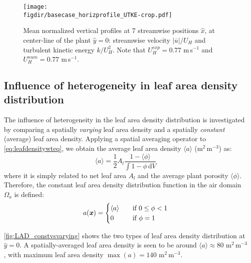 \begin{figure}[t]
	\centering
	\texttt{[image: \\figdir/basecase\_horizprofile\_UTKE-crop.pdf]}
	\caption{Mean normalized vertical profiles at 7 streamwise positions $\hat{x}$, at center-line of the plant $\hat{y} = 0$:  streamwise velocity $|\overline{u}|/U_H$ and  turbulent kinetic energy $k/U_H^2$. Note that $U_H^{\mathit{exp}} = 0.77$ m\,s$^{-1}$ and $U_H^{\mathit{num}} = 0.77$ m\,s$^{-1}$. }
	\label{fig:basecase_horizprofile_UTKE}
\end{figure}

\subsection{Influence of heterogeneity in leaf area density distribution}

The influence of heterogeneity in the leaf area density distribution is investigated by comparing a spatially \textit{varying} leaf area density and a spatially \textit{constant} (average) leaf area density. Applying a spatial averaging operator to \cref{eq:leafdensitywteq}, we obtain the average leaf area density $\langle a\rangle$  (m$^2$\,m$^{-3}$) as:
	\begin{equation}
	\langle a \rangle = \frac{1}{2} {A}_l \frac{1 - \langle \phi \rangle}{\int {1 - \phi }\,\mathrm{d}V}
	\label{eq:leafdensitywteqaverage}
	\end{equation} 
where it is simply related to net leaf area $A_l$ and the average plant porosity $\langle \phi \rangle$. Therefore, the constant leaf area density distribution function in the air domain $\Omega_a$ is defined:
\begin{equation}
a(\textbf{\textit{x}}) =
	\begin{cases}
	\langle a \rangle       	  & \quad \text{if}\ 0\le \phi < 1\\
	0  							  & \quad \text{if}\ \phi = 1
	\end{cases}
	\label{eq:leafdensitywteqaveragefield}
\end{equation}

\cref{fig:LAD_constvsvarying} shows the two types of leaf area density distribution at $\hat{y} = 0$. A spatially-averaged leaf area density is seen to be around $\langle a \rangle \approx 80$ m$^{2}$\,m$^{-3}$, with maximum leaf area density $\max (a) = 140$ m$^{2}$\,m$^{-3}$. %

